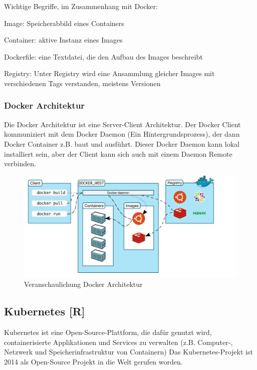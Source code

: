 Wichtige Begriffe, im Zusammenhang mit Docker:

\begin{compactitem}
    \item Image: Speicherabbild eines Containers
    \item Container: aktive Instanz eines Images
    \item Dockerfile: eine Textdatei, die den Aufbau des Images beschreibt
    \item Registry: Unter Registry wird eine Ansammlung gleicher Images mit verschiedenen Tags verstanden, meistens Versionen
\end{compactitem}

\subsubsection{Docker Architektur}
Die Docker Architektur ist eine Server-Client Architektur. Der Docker Client kommuniziert mit dem Docker Daemon (Ein Hintergrundsprozess), der dann Docker Container z.B. baut und ausführt.
Dieser Docker Daemon kann lokal installiert sein, aber der Client kann sich auch mit einem Daemon Remote verbinden.

\begin{figure}[H]
    \centering
    \includegraphics[scale=0.6]{pics/docker architecture.PNG}
    \caption{Veranschaulichung Docker Architektur}
\end{figure}


\subsection{Kubernetes [R]}
Kubernetes ist eine Open-Source-Plattform, die dafür genutzt wird, containerisierte Applikationen und Services zu verwalten (z.B. Computer-, Netzwerk und Speicherinfrastruktur von Containern)
Das Kubernetes-Projekt ist 2014 als Open-Source Projekt in die Welt gerufen worden.

